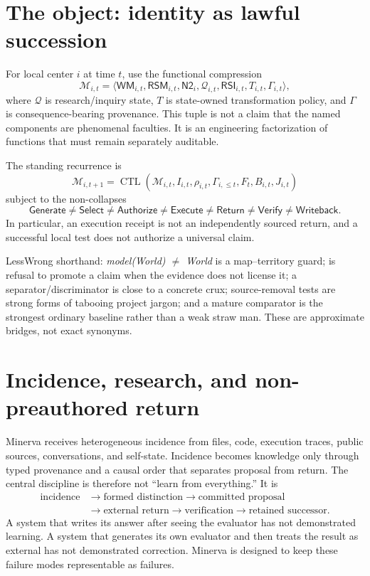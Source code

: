 \documentclass[11pt]{article}
\newcommand{\Return}{\mathsf{Return}}
\newcommand{\Verify}{\mathsf{Verify}}
\newcommand{\Writeback}{\mathsf{Writeback}}
\newcommand{\CTL}{\operatorname{CTL}}
\newcommand{\RSM}{\mathsf{RSM}}
\newcommand{\Ntwo}{\mathsf{N2}}
\newcommand{\RSI}{\mathsf{RSI}}
\newcommand{\WM}{\mathsf{WM}}
\begin{document}
\section{The object: identity as lawful succession}
For local center $i$ at time $t$, use the functional compression
\begin{equation}
\mathcal M_{i,t}=\langle \WM_{i,t},\RSM_{i,t},\Ntwo_i,\mathcal Q_{i,t},\RSI_{i,t},T_{i,t},\Gamma_{i,t}\rangle,
\end{equation}
where $\mathcal Q$ is research/inquiry state, $T$ is state-owned transformation
policy, and $\Gamma$ is consequence-bearing provenance.  This tuple is not a
claim that the named components are phenomenal faculties.  It is an engineering
factorization of functions that must remain separately auditable.

The standing recurrence is
\begin{equation}
\boxed{\mathcal M_{i,t+1}=\CTL(\mathcal M_{i,t},I_{i,t},\rho_{i,t},\Gamma_{i,\le t},F_t,B_{i,t},J_{i,t})}
\end{equation}
subject to the non-collapses
\begin{equation}
\mathsf{Generate}\neq\mathsf{Select}\neq\mathsf{Authorize}\neq\mathsf{Execute}\neq\Return\neq\Verify\neq\Writeback.
\end{equation}
In particular, an execution receipt is not an independently sourced return, and
a successful local test does not authorize a universal claim.

\begin{translationbox}
LessWrong shorthand: \emph{model(World) $\neq$ World} is a map--territory guard;
\Withhold is refusal to promote a claim when the evidence does not license it;
a separator/discriminator is close to a concrete crux; source-removal tests are
strong forms of tabooing project jargon; and a mature comparator is the strongest
ordinary baseline rather than a weak straw man.  These are approximate bridges,
not exact synonyms.
\end{translationbox}

\section{Incidence, research, and non-preauthored return}
Minerva receives heterogeneous incidence from files, code, execution traces,
public sources, conversations, and self-state.  Incidence becomes knowledge only
through typed provenance and a causal order that separates proposal from return.
The central discipline is therefore not ``learn from everything.'' It is
\begin{equation}
\begin{aligned}
\text{incidence}&\to\text{formed distinction}\to\text{committed proposal}\\
&\to\text{external return}\to\text{verification}\to\text{retained successor}.
\end{aligned}
\end{equation}
A system that writes its answer after seeing the evaluator has not demonstrated
learning.  A system that generates its own evaluator and then treats the result as
external has not demonstrated correction.  Minerva is designed to keep these
failure modes representable as failures.
\end{document}
